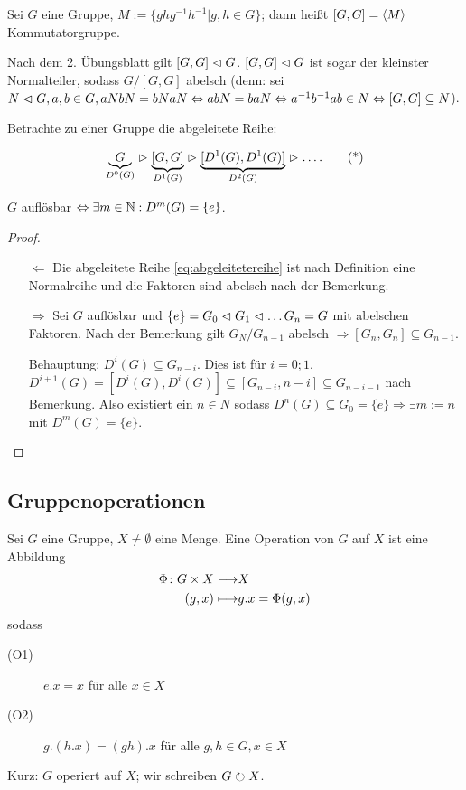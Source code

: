 \documentclass[12pt,a4paper]{scrartcl}
\begin{document}
\begin{defi}
	Sei $G$ eine Gruppe, $M := \{ghg^{-1}h^{-1}|g,h\in G\}$; dann heißt $[G,G] = \langle M\rangle$ Kommutatorgruppe.
\end{defi}

\begin{bem}
	Nach dem 2. Übungsblatt gilt $[G,G] \vartriangleleft G$. $[G,G]\vartriangleleft G$ ist sogar der kleinster Normalteiler, sodass $G/[G,G]$ abelsch (denn: sei $N\vartriangleleft G, a,b\in G, aNbN = bNaN\Leftrightarrow abN = baN\Leftrightarrow a^{-1}b^{-1}ab\in N\Leftrightarrow [G,G]\subseteq N$).
\end{bem}

\noindent
Betrachte zu einer Gruppe die abgeleitete Reihe:

\begin{equation}
\underbrace{G}_{D^0(G)} \vartriangleright \underbrace{[G,G]}_{D^1(G)} \vartriangleright \underbrace{[D^1(G),D^1(G)]}_{D^2(G)} \vartriangleright \ldots . \tag{*}\label{eq:abgeleitetereihe}
\end{equation}

\begin{satz}
	$G$ auflösbar $\Leftrightarrow \exists m\in\mathbb N : D^m(G) = \{e\}$.
\end{satz}
\begin{proof}
	\leavevmode
	\begin{itemize}
		\item [\glqq $\Leftarrow$\grqq] Die abgeleitete Reihe \eqref{eq:abgeleitetereihe} ist nach Definition eine Normalreihe und die Faktoren sind abelsch nach der Bemerkung.
		\item [\glqq $\Rightarrow$\grqq] Sei $G$ auflösbar und $\{e\} = G_0\vartriangleleft G_1\vartriangleleft\dots G_n = G$ mit abelschen Faktoren. Nach der Bemerkung gilt $G_N/G_{n-1}$ abelsch $\Rightarrow [G_n,G_n]\subseteq G_{n-1}$.
		
		Behauptung: $D^i(G) \subseteq G_{n-i}$. Dies ist für $i = 0;1$. $D^{i+1}(G) = [D^i(G), D^i(G)]\subseteq [G_{n-i},{n-i}]\subseteq G_{n-i-1}$ nach Bemerkung. Also existiert ein $n\in N$ sodass $D^n(G) \subseteq G_0 = \{e\}\Rightarrow \exists m:=n$ mit $D^m(G) =\{e\}$.	
	\end{itemize}
\end{proof}


\subsection{Gruppenoperationen}
\begin{defi}
	Sei $G$ eine Gruppe, $X\neq \emptyset$ eine Menge. Eine Operation von $G$ auf $X$ ist eine Abbildung
	\begin{align*}
		\Phi\colon G\times X \longrightarrow & X\\
		(g,x) \longmapsto & g.x = \Phi(g,x)
	\end{align*}
	sodass
	\begin{description}
		\item[(O1)] $e.x = x$ für alle $x\in X$
		\item[(O2)] $g.(h.x) = (gh).x$ für alle $g,h\in G, x\in X$
	\end{description}
	Kurz: $G$ operiert auf $X$; wir schreiben $G\circlearrowright X$.
\end{defi}
\end{document}

